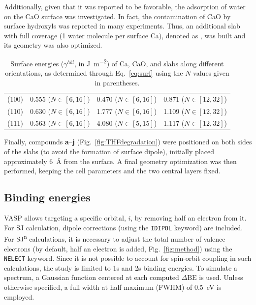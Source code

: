 \documentclass[journal=jpccck,manuscript=article]{achemso}
\def\dbe{\ensuremath{\Delta\text{BE}}}
\begin{document}
Additionally, given that it was reported to be favorable\cite{deleeuwDensityFunctionalTheory2000,fujimoriInteractionWaterCaO2016a}, the adsorption of water on the CaO surface was investigated. In fact, the contamination of CaO by surface hydroxyls was reported in many experiments\cite{dupinSystematicXPSStudies2000,bebenseeAdsorptionOxygenWater2008,fujimoriInteractionWaterCaO2016a,cristXPSLibraryWebsite2021a}. Thus, an additional slab with full coverage (1 water molecule per surface Ca), denoted as , was built and its geometry was also optimized. 

\begin{table}
	\caption{Surface energies ($\gamma^{hkl}$, in \si{\joule\per\meter\squared}) of Ca, CaO, and  slabs along different orientations, as determined through Eq.~\eqref{eq:surf} using the $N$ values given in parentheses.}
	\label{tab:surf}
	\begin{tabular}{lccc}
		\toprule
		&	\ce{Ca^0} & \ce{CaO} &	\ce{CaH2} \\
		\midrule
		(100) & 0.555 ($N\in[6,16]$) & 0.470 ($N\in[6,16]$) & 0.871  ($N\in[12,32]$)\\
		(110) & 0.630  ($N\in[6,16]$)& 1.777  ($N\in[6,16]$)& 1.109 ($N\in[12,32]$)\\
		(111) & 0.563  ($N\in[6,16]$) & 4.080  ($N\in[5,15]$)  & 1.117   ($N\in[12,32]$) \\ 
		\bottomrule
	\end{tabular}
\end{table}

Finally, compounds \textbf{a}--\textbf{j} (Fig.~\ref{fig:THFdegradation}) were positioned on both sides of the slabs (to avoid the formation of surface dipole), initially placed approximately \SI{6}{\angstrom} from the surface. A final geometry optimization was then performed, keeping the cell parameters and the two central layers fixed.

\subsection{Binding energies} 

VASP allows targeting a specific orbital, $i$, by removing half an electron from it. For SJ calculation, dipole corrections (using the \texttt{IDIPOL} keyword) are included. For SJ\textsuperscript{n} calculations, it is necessary to adjust the total number of valence electrons (by default, half an electron is added, Fig.~\ref{fig:method}) using the \texttt{NELECT} keyword. Since it is not possible to account for spin-orbit coupling in such calculations, the study is limited to 1s and 2s binding energies. To simulate a spectrum, a Gaussian function centered at each computed \dbe{} is used. Unless otherwise specified, a full width at half maximum (FWHM) of \SI{0.5}{\electronvolt} is employed.
\end{document}
